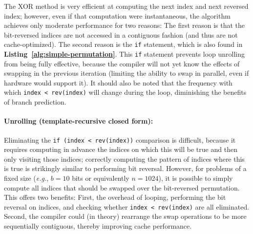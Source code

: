 \documentclass[10pt]{article}
\begin{document}
The XOR method is very efficient at computing the next index and next
reversed index; however, even if that computation were instantaneous,
the algorithm achieves only moderate performance for two reasons: The
first reason is that the bit-reversed indices are not accessed in a
contiguous fashion (and thus are not cache-optimized). The second
reason is the {\tt if} statement, which is also found in {\bf
  Listing~\ref{alg:simple-permutation}}. This {\tt if} statement
prevents loop unrolling from being fully effective, because the
compiler will not yet know the effects of swapping in the previous
iteration (limiting the ability to swap in parallel, even if hardware
would support it). It should also be noted that the frequency with
which {\tt index < rev(index)} will change during the loop,
diminishing the benefits of branch prediction.

\paragraph{Unrolling (template-recursive closed form):}

Eliminating the {\tt if (index < rev(index))} comparison is difficult,
because it requires computing in advance the indices on which this
will be true and then only visiting those indices; correctly computing
the pattern of indices where this is true is strikingly similar to
performing bit reversal. However, for problems of a fixed size
(\emph{e.g.}, $b = 10$ bits or equivalently $n = 1024$), it is
possible to simply compute all indices that should be swapped over the
bit-reversed permutation. This offers two benefits: First, the
overhead of looping, performing the bit reversal on indices, and
checking whether {\tt index < rev(index)} are all eliminated. Second,
the compiler could (in theory) rearrange the swap operations to be
more sequentially contiguous, thereby improving cache performance.
\end{document}
